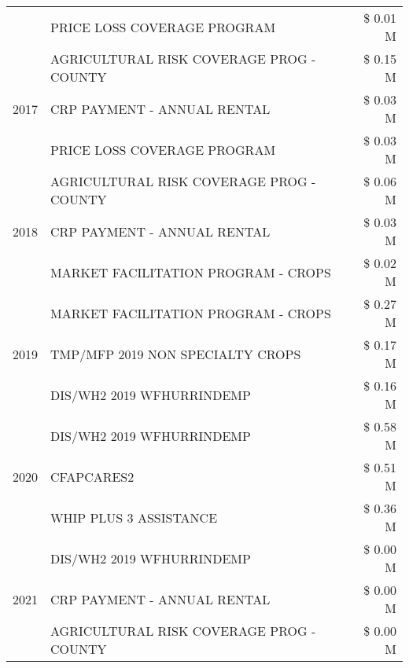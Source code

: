 \begin{tabular}{llr}
 & PRICE LOSS COVERAGE PROGRAM & \$ 0.01 M \\
\cline{1-3}
\multirow[t]{3}{*}{2017} & AGRICULTURAL RISK COVERAGE PROG - COUNTY & \$ 0.15 M \\
 & CRP PAYMENT - ANNUAL RENTAL & \$ 0.03 M \\
 & PRICE LOSS COVERAGE PROGRAM & \$ 0.03 M \\
\cline{1-3}
\multirow[t]{3}{*}{2018} & AGRICULTURAL RISK COVERAGE PROG - COUNTY & \$ 0.06 M \\
 & CRP PAYMENT - ANNUAL RENTAL & \$ 0.03 M \\
 & MARKET FACILITATION PROGRAM - CROPS & \$ 0.02 M \\
\cline{1-3}
\multirow[t]{3}{*}{2019} & MARKET FACILITATION PROGRAM - CROPS & \$ 0.27 M \\
 & TMP/MFP 2019 NON SPECIALTY CROPS & \$ 0.17 M \\
 & DIS/WH2 2019 WFHURRINDEMP & \$ 0.16 M \\
\cline{1-3}
\multirow[t]{3}{*}{2020} & DIS/WH2 2019 WFHURRINDEMP & \$ 0.58 M \\
 & CFAPCARES2 & \$ 0.51 M \\
 & WHIP PLUS 3 ASSISTANCE & \$ 0.36 M \\
\cline{1-3}
\multirow[t]{3}{*}{2021} & DIS/WH2 2019 WFHURRINDEMP & \$ 0.00 M \\
 & CRP PAYMENT - ANNUAL RENTAL & \$ 0.00 M \\
 & AGRICULTURAL RISK COVERAGE PROG - COUNTY & \$ 0.00 M \\
\cline{1-3}
\bottomrule
\end{tabular}
